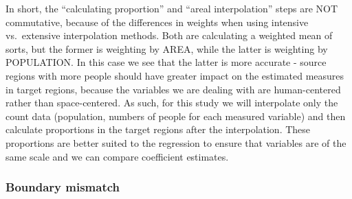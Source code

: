 \documentclass[12pt,twoside]{reedthesis}
\theoremstyle{definition}
\theoremstyle{definition}
\theoremstyle{definition}
\theoremstyle{remark}
\begin{document}
In short, the ``calculating proportion'' and ``areal interpolation''
steps are NOT commutative, because of the differences in weights when
using intensive vs.~extensive interpolation methods. Both are
calculating a weighted mean of sorts, but the former is weighting by
AREA, while the latter is weighting by POPULATION. In this case we see
that the latter is more accurate - source regions with more people
should have greater impact on the estimated measures in target regions,
because the variables we are dealing with are human-centered rather than
space-centered. As such, for this study we will interpolate only the
count data (population, numbers of people for each measured variable)
and then calculate proportions in the target regions after the
interpolation. These proportions are better suited to the regression to
ensure that variables are of the same scale and we can compare
coefficient estimates.

\hypertarget{boundary-mismatch}{%
\subsubsection{Boundary mismatch}\label{boundary-mismatch}}
\end{document}
